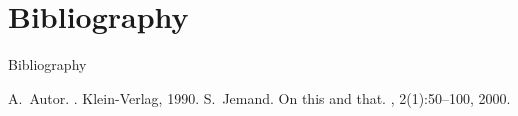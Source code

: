 \documentclass[14pt,xcolor=pdftex,dvipsnames,table, handout]{beamer}
\begin{document}
\section{Bibliography}

\begin{frame}[allowframebreaks]{Bibliography}
  \begin{thebibliography}{10}    
  \beamertemplatebookbibitems
    A.~Autor.
    .
    \newblock Klein-Verlag, 1990.
  \beamertemplatearticlebibitems
    S.~Jemand.
    \newblock On this and that.
    , 2(1):50--100, 2000.
  \end{thebibliography}
\end{frame}
\end{document}
